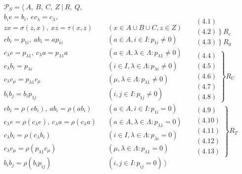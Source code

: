 \documentclass[11pt]{amsart}
\theoremstyle{plain}
\begin{document}
\[
\begin{array}{cc}
\begin{array}{rcl}
\mathcal{P}_S = \langle \ A, \ B, \ C, \ Z \ | \ R, \ Q, & &    \\ 
b_i e = b_i, \ ec_{\lambda} = c_{\lambda}, & &  \\
zx = \sigma(z,x), \ xz = \tau(x,z) & & (x \in A \cup B \cup C, z \in Z)  \\
eb_i = p_{1 i}, \ ab_i = ap_{1 i} & & (a \in A, i \in I: p_{1 i} \neq 0)    \\
c_{\lambda} e = p_{\lambda 1}, \ c_{\lambda} a = p_{\lambda 1} a & & (a \in A, \lambda \in \Lambda: p_{\lambda 1} \neq 0) \\
c_{\lambda} b_i = p_{\lambda i} & & (i \in I, \lambda \in \Lambda : p_{\lambda i} \neq 0) \\
c_{\lambda} c_{\mu} = p_{\lambda 1} c_{\mu} & & (\mu, \lambda \in \Lambda : p_{\lambda 1} \neq 0) \\
b_i b_j = b_i p_{1 j} & & (i, j \in I: p_{1 j} \neq 0) \\
e b_i = \rho(eb_i), \ ab_i = \rho(ab_i) & & (a \in A, i \in I: p_{1 i} = 0) \\
c_{\lambda} e = \rho(c_{\lambda} e), \ c_{\lambda} a = \rho(c_{\lambda} a) & & (a \in A, \lambda \in \Lambda: p_{\lambda 1} = 0) \\
c_{\lambda} b_i = \rho(c_{\lambda} b_i) & & (i \in I, \lambda \in \Lambda: p_{\lambda i}=0) \\
c_{\lambda} c_{\mu} = \rho(p_{\lambda 1} c_{\mu}) & & (\mu, \lambda \in \Lambda: p_{\lambda 1} = 0) \\
b_i b_j = \rho(b_i p_{i j}) & & (i, j \in I: p_{i j}=0) \ \rangle
\end{array} & 
\begin{array}{c}
\left. \begin{array}{l}
(4.1) \\
(4.2) \ \} \ R_e \\
(4.3) \ \} \ R_0
\end{array} \right. \\
\left. \begin{array}{r}
(4.4) \\
(4.5) \\
(4.6) \\
(4.7) \\
(4.8) 
\end{array} \right\} R_U \\
\left. \begin{array}{r}
(4.9) \\
(4.10) \\
(4.11) \\
(4.12) \\
(4.13) 
\end{array} \right\} R_T
\end{array}
\end{array}
\]
\end{document}
